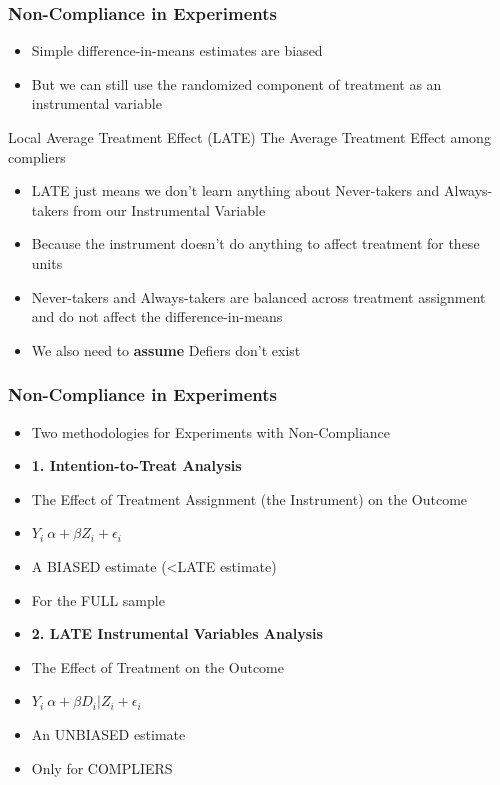 \documentclass[xcolor=x11names,compress]{beamer}\usepackage[]{graphicx}\usepackage[]{color}
\renewcommand{\(}{\begin{columns}}
\renewcommand{\)}{\end{columns}}
\newcommand{\<}[1]{\begin{column}{#1}}
\renewcommand{\>}{\end{column}}
\begin{document}
\begin{frame}
\frametitle{Non-Compliance in Experiments}
\begin{itemize}
\item Simple difference-in-means estimates are biased
\pause
\item But we can still use the randomized component of treatment as an instrumental variable
\pause
\end{itemize}
\begin{block}{Local Average Treatment Effect (LATE)}
The Average Treatment Effect among compliers
\end{block}
\begin{itemize}
\item LATE just means we don't learn anything about Never-takers and Always-takers from our Instrumental Variable
\pause
\item Because the instrument doesn't do anything to affect treatment for these units
\pause
\item Never-takers and Always-takers are balanced across treatment assignment and do not affect the difference-in-means
\pause
\item We also need to \textbf{assume} Defiers don't exist
\end{itemize}
\end{frame}

\begin{frame}
\frametitle{Non-Compliance in Experiments}
\begin{itemize}
\item Two methodologies for Experiments with Non-Compliance
\end{itemize}
\begin{multicols}{2}
\begin{itemize}
\item \textbf{1. Intention-to-Treat Analysis}
\pause
\item The Effect of Treatment Assignment (the Instrument) on the Outcome
\pause
\item $Y_i ~ \alpha + \beta Z_i + \epsilon_i$
\pause
\item A BIASED estimate (<LATE estimate)
\pause
\item For the FULL sample
\end{itemize}
\columnbreak
\begin{itemize}
\item \textbf{2. LATE Instrumental Variables Analysis}
\pause
\item The Effect of Treatment on the Outcome
\pause
\item $Y_i ~ \alpha + \beta D_i|Z_i + \epsilon_i$
\pause
\item An UNBIASED estimate
\pause
\item Only for COMPLIERS
\end{itemize}
\end{multicols}
\end{frame}
\end{document}
